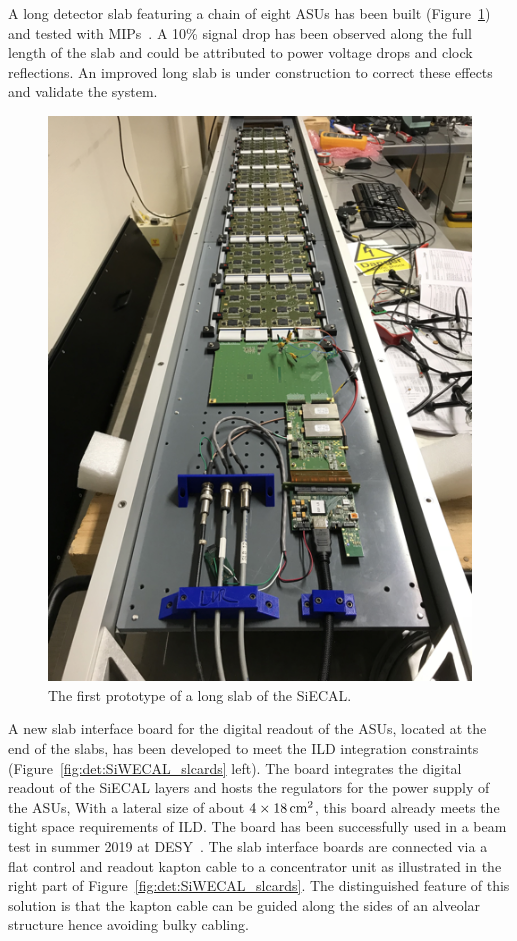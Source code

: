 
A long detector slab featuring a chain of eight ASUs has been built (Figure~\ref{fig:det:siw-longslab}) and tested with MIPs~\cite{Magniette:2019nyg}. 
A 10\% signal drop has been observed along the full length of the slab and could be attributed to power voltage drops and clock reflections. An improved long slab is under construction to correct these effects and validate the system. 

\begin{figure}[t!]
\centering
\includegraphics[width=0.32\hsize,angle=90]{Detector/fig/siwecal-longslab.png}
\caption{The first prototype of a long slab of the SiECAL.}
\label{fig:det:siw-longslab}
\end{figure}


 A new slab interface board for the digital readout of the ASUs, located at the end of the slabs, has been developed to meet the ILD integration constraints (Figure~\ref{fig:det:SiWECAL_slcards} left). The board integrates the digital readout of the SiECAL layers and hosts the regulators for the power supply of the ASUs,
 With a lateral size of about $4\times 18\,{\rm cm^2}$, this board already meets the tight space requirements of ILD. The board has been successfully used in a beam test in summer 2019 at DESY~\cite{bib:talk-twepp-jj}.
 The slab interface boards are connected via a flat control and readout kapton cable to a concentrator unit as illustrated in the right part of Figure~\ref{fig:det:SiWECAL_slcards}. 
 The distinguished feature of this solution is that the kapton cable can be guided along the sides of an alveolar structure hence avoiding bulky cabling. 
 
